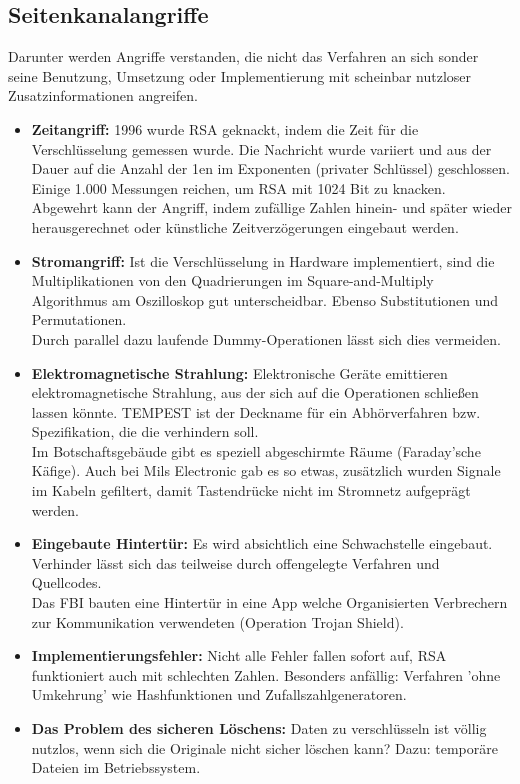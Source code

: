 \subsection{Seitenkanalangriffe}
Darunter werden Angriffe verstanden, die nicht das Verfahren an sich sonder seine Benutzung, Umsetzung oder Implementierung mit scheinbar nutzloser Zusatzinformationen angreifen.
\begin{itemize}
	\item \textbf{Zeitangriff:} 1996 wurde RSA geknackt, indem die Zeit für die Verschlüsselung gemessen wurde. Die Nachricht wurde variiert und aus der Dauer auf die Anzahl der 1en im Exponenten (privater Schlüssel) geschlossen. Einige 1.000 Messungen reichen, um RSA mit 1024 Bit zu knacken. \\ Abgewehrt kann der Angriff, indem zufällige Zahlen hinein- und später wieder herausgerechnet oder künstliche Zeitverzögerungen eingebaut werden.
	\item \textbf{Stromangriff:} Ist die Verschlüsselung in Hardware implementiert, sind die Multiplikationen von den Quadrierungen im Square-and-Multiply Algorithmus am Oszilloskop gut unterscheidbar. Ebenso Substitutionen und Permutationen. \\ Durch parallel dazu laufende Dummy-Operationen lässt sich dies vermeiden.
	\item \textbf{Elektromagnetische Strahlung:} Elektronische Geräte emittieren elektromagnetische Strahlung, aus der sich auf die Operationen schließen lassen könnte. TEMPEST ist der Deckname für ein Abhörverfahren bzw. Spezifikation, die die verhindern soll. \\
	Im Botschaftsgebäude gibt es speziell abgeschirmte Räume (Faraday'sche Käfige). Auch bei Mils Electronic gab es so etwas, zusätzlich wurden Signale im Kabeln gefiltert, damit Tastendrücke nicht im Stromnetz aufgeprägt werden.
	\item \textbf{Eingebaute Hintertür:} Es wird absichtlich eine Schwachstelle eingebaut. Verhinder lässt sich das teilweise durch offengelegte Verfahren und Quellcodes. \\
	Das FBI bauten eine Hintertür in eine App welche Organisierten Verbrechern zur Kommunikation verwendeten (Operation Trojan Shield).
	\item \textbf{Implementierungsfehler:} Nicht alle Fehler fallen sofort auf, RSA funktioniert auch mit schlechten Zahlen. Besonders anfällig: Verfahren 'ohne Umkehrung' wie Hashfunktionen und Zufallszahlgeneratoren.
	\item \textbf{Das Problem des sicheren Löschens:} Daten zu verschlüsseln ist völlig nutzlos, wenn sich die Originale nicht sicher löschen kann? Dazu: temporäre Dateien im Betriebssystem.
\end{itemize}

